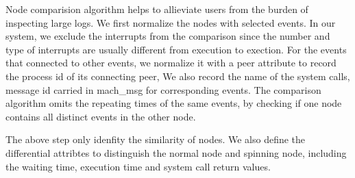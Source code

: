 Node comparision algorithm helps to allieviate users from the burden of
inspecting large logs.  We first normalize the nodes with selected events.  In
our system, we exclude the interrupts from the comparison since the number and
type of interrupts are usually different from execution to exection.  For the
events that connected to other events, we normalize it with a peer attribute to
record the process id of its connecting peer, We also record the name of the
system calls, message id carried in mach\_msg for corresponding events.  The
comparison algorithm omits the repeating times of the same events, by checking
if one node contains all distinct events in the other node.

The above step only idenfity the similarity of nodes.  We also define the
differential attribtes to distinguish the normal node and spinning node,
including the waiting time, execution time and system call return values.

